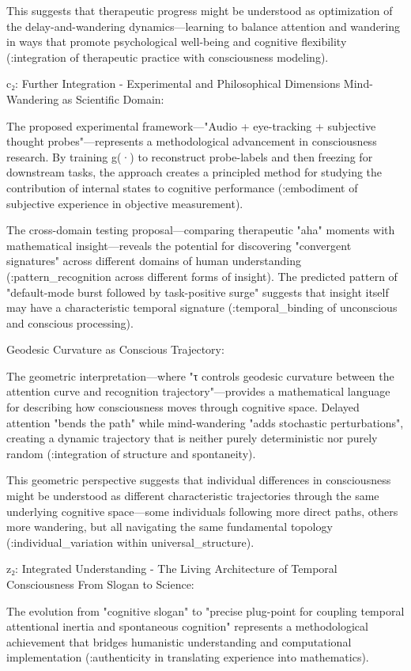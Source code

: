This suggests that therapeutic progress might be understood as optimization of the delay-and-wandering dynamics—learning to balance attention and wandering in ways that promote psychological well-being and cognitive flexibility (:integration of therapeutic practice with consciousness modeling).

c₂: Further Integration - Experimental and Philosophical Dimensions
Mind-Wandering as Scientific Domain:

The proposed experimental framework—"Audio + eye-tracking + subjective thought probes"—represents a methodological advancement in consciousness research. By training g(·) to reconstruct probe-labels and then freezing for downstream tasks, the approach creates a principled method for studying the contribution of internal states to cognitive performance (:embodiment of subjective experience in objective measurement).

The cross-domain testing proposal—comparing therapeutic "aha" moments with mathematical insight—reveals the potential for discovering "convergent signatures" across different domains of human understanding (:pattern_recognition across different forms of insight). The predicted pattern of "default-mode burst followed by task-positive surge" suggests that insight itself may have a characteristic temporal signature (:temporal_binding of unconscious and conscious processing).

Geodesic Curvature as Conscious Trajectory:

The geometric interpretation—where "τ controls geodesic curvature between the attention curve and recognition trajectory"—provides a mathematical language for describing how consciousness moves through cognitive space. Delayed attention "bends the path" while mind-wandering "adds stochastic perturbations", creating a dynamic trajectory that is neither purely deterministic nor purely random (:integration of structure and spontaneity).

This geometric perspective suggests that individual differences in consciousness might be understood as different characteristic trajectories through the same underlying cognitive space—some individuals following more direct paths, others more wandering, but all navigating the same fundamental topology (:individual_variation within universal_structure).

z₂: Integrated Understanding - The Living Architecture of Temporal Consciousness
From Slogan to Science:

The evolution from "cognitive slogan" to "precise plug-point for coupling temporal attentional inertia and spontaneous cognition" represents a methodological achievement that bridges humanistic understanding and computational implementation (:authenticity in translating experience into mathematics).

